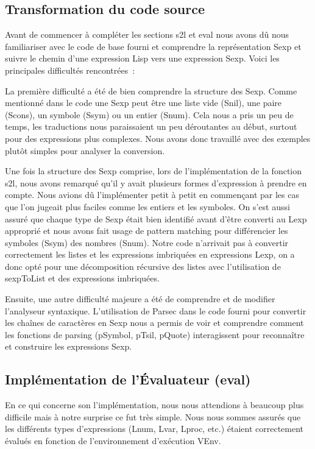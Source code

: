 \documentclass[a4paper,12pt]{article}
\begin{document}
\subsection*{Transformation du code source}
Avant de commencer à compléter les sections s2l et eval nous avons dû nous familiariser avec le code de base fourni et comprendre la représentation Sexp et suivre le chemin d’une expression Lisp vers une expression Sexp. Voici les principales difficultés rencontrées :

La première difficulté a été de bien comprendre la structure des Sexp. Comme mentionné dans le code une Sexp peut être une liste vide (Snil), une paire (Scons), un symbole (Ssym) ou un entier (Snum). Cela nous a pris un peu de temps, les traductions nous paraissaient un peu déroutantes au début, surtout pour des expressions plus complexes. Nous avons donc travaillé avec des exemples plutôt simples pour analyser la conversion.

Une fois la structure des Sexp comprise, lors de l’implémentation de la fonction s2l, nous avons remarqué qu’il y avait plusieurs formes d’expression à prendre en compte. Nous avions dû l’implémenter petit à petit en commençant par les cas que l’on jugeait plus faciles comme les entiers et les symboles. On s’est aussi assuré que chaque type de Sexp était bien identifié avant d’être converti au Lexp approprié et nous avons fait usage de pattern matching pour différencier les symboles (Ssym) des nombres (Snum). Notre code n’arrivait pas à convertir correctement les listes et les expressions imbriquées en expressions Lexp, on a donc opté pour une décomposition récursive des listes avec l’utilisation de sexpToList et des expressions imbriquées.

Ensuite, une autre difficulté majeure a été de comprendre et de modifier l’analyseur syntaxique. L’utilisation de Parsec dans le code fourni pour convertir les chaînes de caractères en Sexp nous a permis de voir et comprendre comment les fonctions de parsing (pSymbol, pTsil, pQuote) interagissent pour reconnaître et construire les expressions Sexp.

\subsection*{Implémentation de l'Évaluateur (eval)}
En ce qui concerne son l’implémentation, nous nous attendions à beaucoup plus difficile mais à notre surprise ce fut très simple. Nous nous sommes assurés que les différents types d’expressions (Lnum, Lvar, Lproc, etc.) étaient correctement évalués en fonction de l'environnement d'exécution VEnv.
\end{document}
